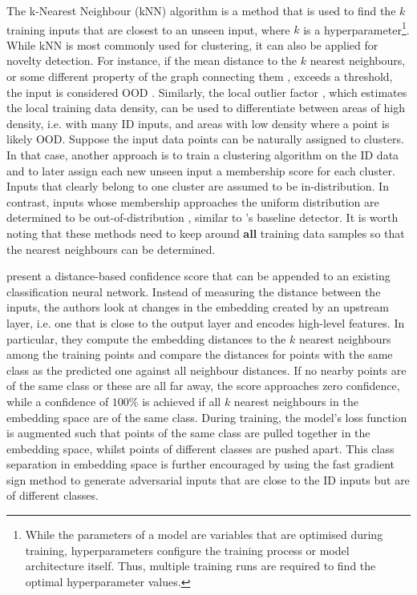 \newpar The k-Nearest Neighbour (kNN) algorithm is a method that is used to find the $k$ training inputs that are closest to an unseen input, where $k$ is a hyperparameter\footnote{While the parameters of a model are variables that are optimised during training, hyperparameters configure the training process or model architecture itself. Thus, multiple training runs are required to find the optimal hyperparameter values.}. While kNN is most commonly used for clustering, it can also be applied for novelty detection. For instance, if the mean distance to the $k$ nearest neighbours, or some different property of the graph connecting them \cite{knn-outlier-2004}, exceeds a threshold, the input is considered OOD \cite{novelty-detection-2010}. Similarly, the local outlier factor \cite{lof-outlier-2000}, which estimates the local training data density, can be used to differentiate between areas of high density, i.e. with many ID inputs, and areas with low density where a point is likely OOD. Suppose the input data points can be naturally assigned to clusters. In that case, another approach is to train a clustering algorithm on the ID data and to later assign each new unseen input a membership score for each cluster. Inputs that clearly belong to one cluster are assumed to be in-distribution. In contrast, inputs whose membership approaches the uniform distribution are determined to be out-of-distribution \cite{cluster-novelty-2008}, similar to \citeauthor{ood-baseline-2016}'s baseline detector. It is worth noting that these methods need to keep around \textbf{all} training data samples so that the nearest neighbours can be determined.

\newpar \textcite{distance-confidence-2017} present a distance-based confidence score that can be appended to an existing classification neural network. Instead of measuring the distance between the inputs, the authors look at changes in the embedding created by an upstream layer, i.e. one that is close to the output layer and encodes high-level features. In particular, they compute the embedding distances to the $k$ nearest neighbours among the training points and compare the distances for points with the same class as the predicted one against all neighbour distances. If no nearby points are of the same class or these are all far away, the score approaches zero confidence, while a confidence of $100\%$ is achieved if all $k$ nearest neighbours in the embedding space are of the same class. During training, the model's loss function is augmented such that points of the same class are pulled together in the embedding space, whilst points of different classes are pushed apart. This class separation in embedding space is further encouraged by using the fast gradient sign method \cite{fast-gradient-2014} to generate adversarial inputs that are close to the ID inputs but are of different classes.

